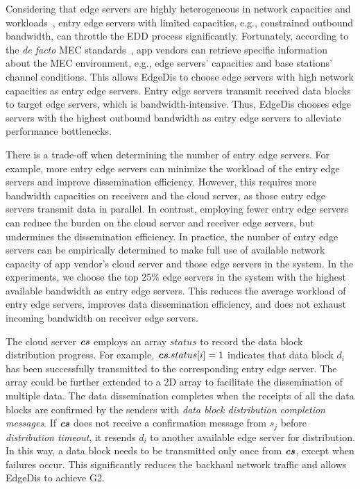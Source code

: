 \documentclass[10pt,journal,compsoc]{IEEEtran}
\def\mathbi#1{\textbf{\em #1}}
\begin{document}
Considering that edge servers are highly heterogeneous in network capacities and workloads~\cite{yao2017heterogeneous, pasteris2019service, gai2017sa}, entry edge servers with limited capacities, e.g., constrained outbound bandwidth, can throttle the EDD process significantly. Fortunately, according to the \textit{de facto} MEC standards~\cite{kekki2018mec, sabella2019developing}, app vendors can retrieve specific information about the MEC environment, e.g., edge servers' capacities and base stations' channel conditions. This allows EdgeDis to choose edge servers with high network capacities as entry edge servers. Entry edge servers transmit received data blocks to target edge servers, which is bandwidth-intensive. Thus, EdgeDis chooses edge servers with the highest outbound bandwidth as entry edge servers to alleviate performance bottlenecks. 

There is a trade-off when determining the number of entry edge servers. For example, more entry edge servers can minimize the workload of the entry edge servers and improve dissemination efficiency. However, this requires more bandwidth capacities on receivers and the cloud server, as those entry edge servers transmit data in parallel. In contrast, employing fewer entry edge servers can reduce the burden on the cloud server and receiver edge servers, but undermines the dissemination efficiency. In practice, the number of entry edge servers can be empirically determined to make full use of available network capacity of app vendor's cloud server and those edge servers in the system. In the experiments, we choose the top 25\% edge servers in the system with the highest available bandwidth as entry edge servers. This reduces the average workload of entry edge servers, improves data dissemination efficiency, and does not exhaust incoming bandwidth on receiver edge servers.

The cloud server $\mathbi{cs}$ employs an array $status$ to record the data block distribution progress. For example, $\mathbi{cs}.status[i]=1$ indicates that data block $d_i$ has been successfully transmitted to the corresponding entry edge server. The array could be further extended to a 2D array to facilitate the dissemination of multiple data. The data dissemination completes when the receipts of all the data blocks are confirmed by the senders with \textit{data block distribution completion messages}. If $\mathbi{cs}$ does not receive a confirmation message from $s_j$ before \textit{distribution timeout}, it resends $d_i$ to another available edge server for distribution. In this way, a data block needs to be transmitted only once from $\mathbi{cs}$, except when failures occur. This significantly reduces the backhaul network traffic and allows EdgeDis to achieve G2.
\end{document}
